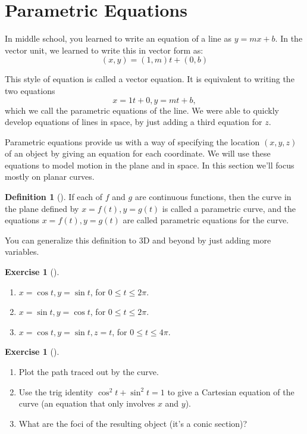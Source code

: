 \documentclass[10pt,]{book}
\theoremstyle{plain}
\theoremstyle{definition}
\newtheorem{definition}[theorem]{Definition}
\theoremstyle{definition}
\theoremstyle{definition}
\theoremstyle{definition}
\newtheorem{exploration}[project]{Exercise}
\theoremstyle{definition}
\numberwithin{equation}{section}
\begin{document}
\section[{Parametric Equations}]{Parametric Equations}\label{section-12}
In middle school, you learned to write an equation of a line as \(y=mx+b\). In the vector unit, we learned to write this in vector form as:%
\begin{equation*}
(x,y)=(1,m)t+(0,b)
\end{equation*}
%
\par
This style of equation is called a vector equation. It is equivalent to writing the two equations%
\begin{equation*}
x=1t+0,y=mt+b,
\end{equation*}
which we call the parametric equations of the line. We were able to quickly develop equations of lines in space, by just adding a third equation for \(z\).%
\par
Parametric equations provide us with a way of specifying the location \((x,y,z)\) of an object by giving an equation for each coordinate. We will use these equations to model motion in the plane and in space. In this section we'll focus mostly on planar curves.%
\begin{definition}[{}]\label{definition-18}
If each of \(f\) and \(g\) are continuous functions, then the curve in the plane defined by \(x=f(t),y=g(t)\) is called a parametric curve, and the equations \(x=f(t),y=g(t)\) are called parametric equations for the curve.%
\end{definition}
You can generalize this definition to 3D and beyond by just adding more variables.%
\begin{exploration}[]\label{exploration-72}
\leavevmode%
\begin{enumerate}[font=\bfseries,label=(\alph*),ref=\alph*]
\item\label{task-116} \(x=\cos t, y=\sin t\), for \(0\leq t\leq 2\pi\).%
\item\label{task-117} \(x=\sin t, y=\cos t\), for \(0\leq t\leq 2\pi\).%
\item\label{task-118} \(x=\cos t, y=\sin t, z=t\), for \(0\leq t\leq 4\pi\).%
\end{enumerate}
\end{exploration}
\begin{exploration}[]\label{exploration-73}
\leavevmode%
\begin{enumerate}[font=\bfseries,label=(\alph*),ref=\alph*]
\item\label{task-119} Plot the path traced out by the curve.%
\item\label{task-120} Use the trig identity \(\cos^2t+\sin^2t=1\) to give a Cartesian equation of the curve (an equation that only involves \(x\) and \(y\)).%
\item\label{task-121} What are the foci of the resulting object (it's a conic section)?%
\end{enumerate}
\end{exploration}
\end{document}
